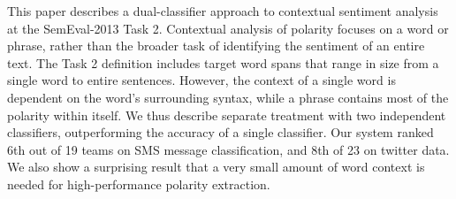 This paper describes a dual-classifier approach to contextual sentiment analysis at the SemEval-2013 Task 2. Contextual analysis of polarity focuses on
 a word or phrase, rather than the broader task of identifying the sentiment of
 an entire text. The Task 2 definition includes target word spans that range in
 size from a single word to entire sentences. However, the context of a single
 word is dependent on the word's surrounding syntax, while a phrase contains
 most of the polarity within itself. We thus describe separate treatment with
 two independent classifiers, outperforming the accuracy of a single classifier.
 Our system ranked 6th out of 19 teams on SMS message classification, and 8th of
 23 on twitter data. We also show a surprising result that a very small amount
 of word context is needed for high-performance polarity extraction.

